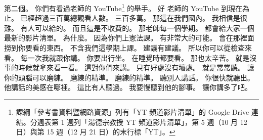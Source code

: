 \hypertarget{c01:cue:449}{}第二個。
\hypertarget{c01:cue:450}{}你們有看過老師的 YouTube\footnote{課綱「參考書資料暨網路資源」列有「YT 頻道影片清單」的 Google Drive 連結。分週表第 1 週列「湯德宗教授 YT 頻道影片清單」，第 5 週（10 月 12 日）與第 15 週（12 月 21 日）的末行標「YT」。} 的舉手。
\hypertarget{c01:cue:451}{}好 老師的 YouTube 到現在為止。
\hypertarget{c01:cue:452}{}已經超過三百萬總觀看人數。
\hypertarget{c01:cue:453}{}三百多萬。
\hypertarget{c01:cue:454}{}那這在我們國內。
\hypertarget{c01:cue:455}{}我相信是很難。
\hypertarget{c01:cue:456}{}有人可以給的。
\hypertarget{c01:cue:457}{}而且這是不收費的。
\hypertarget{c01:cue:458}{}那老師每一個學期。
\hypertarget{c01:cue:459}{}都會給大家一個最新的影片清單。
\hypertarget{c01:cue:460}{}為什麼。
\hypertarget{c01:cue:461}{}因為你們上憲法課。
\hypertarget{c01:cue:462}{}有非常大的可能。
\hypertarget{c01:cue:463}{}會在那裡面撈到你要看的東西。
\hypertarget{c01:cue:464}{}不含我們這學期上課。
\hypertarget{c01:cue:465}{}建議有建議。
\hypertarget{c01:cue:466}{}所以你可以從檢查來看。
\hypertarget{c01:cue:467}{}每一次我就跟你講。
\hypertarget{c01:cue:468}{}你要出行坐。
\hypertarget{c01:cue:469}{}在睡覺時都要看。
\hypertarget{c01:cue:470}{}那也太辛苦。
\hypertarget{c01:cue:471}{}就是沒事的時候就拿來看一看。
\hypertarget{c01:cue:472}{}這對你們來講。
\hypertarget{c01:cue:473}{}只有好處沒有壞處。
\hypertarget{c01:cue:474}{}就是常常聽。
\hypertarget{c01:cue:475}{}讓你的頭腦可以磨練。
\hypertarget{c01:cue:476}{}磨練的精準。
\hypertarget{c01:cue:477}{}磨練的精準。
\hypertarget{c01:cue:478}{}聽別人講話。
\hypertarget{c01:cue:479}{}你很快就聽出。
\hypertarget{c01:cue:480}{}他講話的美感在哪裡。
\hypertarget{c01:cue:481}{}這比有人聽過。
\hypertarget{c01:cue:482}{}我要慢聽到他的腳事。
\hypertarget{c01:cue:483}{}讓你講多了吧。

